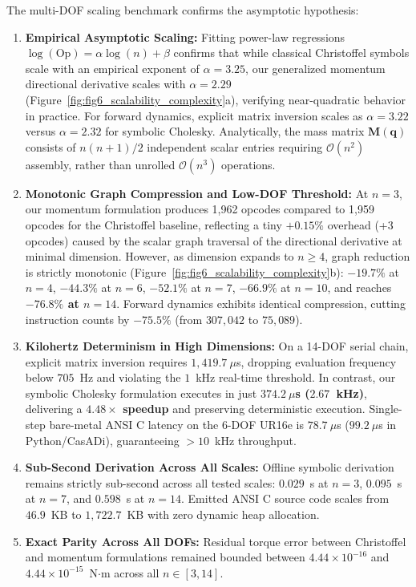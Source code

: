 \documentclass[fleqn,10pt]{article}
\begin{document}
The multi-DOF scaling benchmark confirms the asymptotic hypothesis:
\begin{enumerate}
	\item \textbf{Empirical Asymptotic Scaling:} Fitting power-law regressions $\log(\text{Op}) = \alpha \log(n) + \beta$ confirms that while classical Christoffel symbols scale with an empirical exponent of $\alpha = 3.25$, our generalized momentum directional derivative scales with $\alpha = 2.29$ (Figure~\ref{fig:fig6_scalability_complexity}a), verifying near-quadratic behavior in practice. For forward dynamics, explicit matrix inversion scales as $\alpha = 3.22$ versus $\alpha = 2.32$ for symbolic Cholesky. Analytically, the mass matrix $\bm{M}(\bm{q})$ consists of $n(n+1)/2$ independent scalar entries requiring $\mathcal{O}(n^2)$ assembly, rather than unrolled $\mathcal{O}(n^3)$ operations.
	\item \textbf{Monotonic Graph Compression and Low-DOF Threshold:} At $n=3$, our momentum formulation produces 1,962 opcodes compared to 1,959 opcodes for the Christoffel baseline, reflecting a tiny $+0.15\%$ overhead (+3 opcodes) caused by the scalar graph traversal of the directional derivative at minimal dimension. However, as dimension expands to $n \ge 4$, graph reduction is strictly monotonic (Figure~\ref{fig:fig6_scalability_complexity}b): $-19.7\%$ at $n=4$, $-44.3\%$ at $n=6$, $-52.1\%$ at $n=7$, $-66.9\%$ at $n=10$, and reaches \textbf{$-76.8\%$ at $n=14$}. Forward dynamics exhibits identical compression, cutting instruction counts by \textbf{$-75.5\%$} (from $307,042$ to $75,089$).
	\item \textbf{Kilohertz Determinism in High Dimensions:} On a 14-DOF serial chain, explicit matrix inversion requires $1,419.7~\mu$s, dropping evaluation frequency below $705$~Hz and violating the $1$~kHz real-time threshold. In contrast, our symbolic Cholesky formulation executes in just \textbf{$374.2~\mu$s ($2.67$~kHz)}, delivering a \textbf{$4.48\times$ speedup} and preserving deterministic execution. Single-step bare-metal ANSI C latency on the 6-DOF UR16e is $78.7~\mu$s ($99.2~\mu$s in Python/CasADi), guaranteeing $>10$~kHz throughput.
	\item \textbf{Sub-Second Derivation Across All Scales:} Offline symbolic derivation remains strictly sub-second across all tested scales: $0.029$~s at $n=3$, $0.095$~s at $n=7$, and $0.598$~s at $n=14$. Emitted ANSI C source code scales from $46.9$~KB to $1,722.7$~KB with zero dynamic heap allocation.
	\item \textbf{Exact Parity Across All DOFs:} Residual torque error between Christoffel and momentum formulations remained bounded between $4.44 \times 10^{-16}$ and $4.44 \times 10^{-15}$~N$\cdot$m across all $n \in [3, 14]$.
\end{enumerate}
\end{document}
